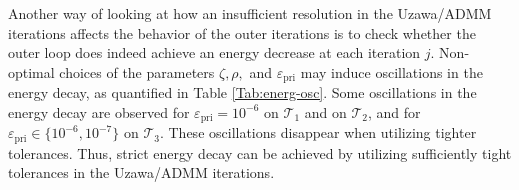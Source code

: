 \documentclass[a4paper,11pt]{article}
\theoremstyle{definition}
\theoremstyle{remark}
\numberwithin{equation}{section}
\newcommand{\calT}{\mathcal{T}}
\begin{document}
Another way of looking at how an insufficient resolution in the Uzawa/ADMM iterations affects the behavior of the outer iterations is to check whether the outer loop does indeed achieve an energy decrease at each iteration $j$. 
Non-optimal choices of the parameters $\zeta, \rho,$ and $\varepsilon_{\text{pri}}$ may induce oscillations in the energy decay, as quantified in Table \ref{Tab:energ-osc}. 
Some oscillations in the energy decay are observed for $\varepsilon_{\text{pri}}=10^{-6}$ on $\calT_1$ and on $\calT_2$, and for $\varepsilon_{\text{pri}}\in\{10^{-6},10^{-7}\}$ on $\calT_3$. These oscillations disappear when utilizing tighter tolerances. Thus, strict energy decay can be achieved by utilizing sufficiently tight tolerances in the Uzawa/ADMM iterations.
\end{document}
